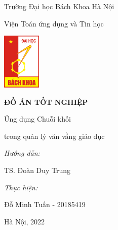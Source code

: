\begin{titlepage}
    \centering
    \vspace{0.25cm}
    {\large Trường Đại học Bách Khoa Hà Nội\par}
    \vspace{0.25cm}
    {\normalsize Viện Toán ứng dụng và Tin học\par}
    \vspace{0.75cm}
    {\includegraphics[width=69px]{images/hust-logo.png}\par}
    \vspace{1cm}
    {\Large\textbf{ĐỒ ÁN TỐT NGHIỆP}\par}
    \vspace{1.5cm}
    {\large Ứng dụng Chuỗi khối\par}
    \vspace{0.25cm}
    {\large trong quản lý văn vằng giáo dục\par}
    \vspace{1.25cm}
    \begin{flushleft}
        \hspace{3cm}
        {\normalsize\textit{Hướng dẫn:}\par}
        \vspace{0.125cm}
        \hspace{5cm}
        {\normalsize TS. Đoàn Duy Trung\par}
        \vspace{0.125cm}
        \hspace{3cm}
        {\normalsize\textit{Thực hiện:}\par}
        \vspace{0.125cm}
        \hspace{5cm}
        {\normalsize Đỗ Minh Tuấn - 20185419\par}
    \end{flushleft}
    \vspace{3cm}
    {\normalsize Hà Nội, 2022\par}
    \vspace{0.5cm}
\end{titlepage}